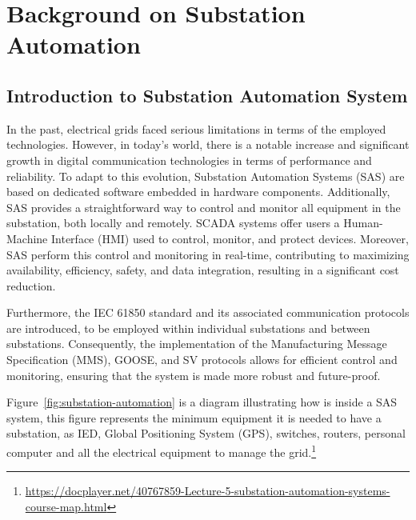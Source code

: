 
\chapter{Background on Substation Automation} %

\label{chap:Chapter2} %

\section{Introduction to Substation Automation System}
In the past, electrical grids faced serious limitations in terms of the employed technologies. However, in today's world, there is a notable increase and significant growth in digital communication technologies in terms of performance and reliability. To adapt to this evolution, Substation Automation Systems (SAS) are based on dedicated software embedded in hardware components. Additionally, SAS provides a straightforward way to control and monitor all equipment in the substation, both locally and remotely. SCADA systems offer users a Human-Machine Interface (HMI) used to control, monitor, and protect devices. Moreover, SAS perform this control and monitoring in real-time, contributing to maximizing availability, efficiency, safety, and data integration, resulting in a significant cost reduction.

Furthermore, the IEC 61850 standard and its associated communication protocols are introduced, to be employed within individual substations and between substations. Consequently, the implementation of the Manufacturing Message Specification (MMS), GOOSE, and SV protocols allows for efficient control and monitoring, ensuring that the system is made more robust and future-proof.

Figure~\ref{fig:substation-automation} is a diagram illustrating how is inside a SAS system, this figure  represents the minimum equipment it is needed to have a substation, as IED, Global Positioning System (GPS), switches, routers, personal computer and all the electrical equipment to manage the grid.\footnote{\url{https://docplayer.net/40767859-Lecture-5-substation-automation-systems-course-map.html}}

